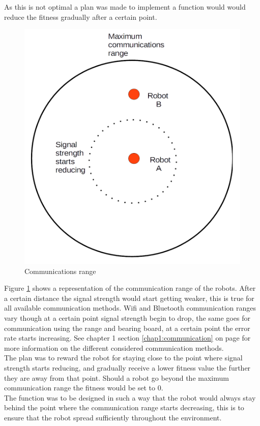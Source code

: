 As this is not optimal a plan was made to implement a function would would reduce the fitness gradually after a certain point. 

\begin{figure}[h]
\centering
\includegraphics[scale=0.5]{Chapter4/images/comms.png}
\caption{Communications range}
\label{fig:coms}
\end{figure}

Figure \ref{fig:coms} shows a representation of the communication range of the robots. After a certain distance the signal strength would start getting weaker, this is true for all available communication methods. Wifi and Bluetooth communication ranges vary though at a certain point signal strength begin to drop, the same goes for communication using the range and bearing board, at a certain point the error rate starts increasing. See chapter 1 section \ref{chap1:communication} on page \pageref{chap1:communication} for more information on the different considered communication methods. \\

The plan was to reward the robot for staying close to the point where signal strength starts reducing, and gradually receive a lower fitness value the further they are away from that point. Should a robot go beyond the maximum communication range the fitness would be set to 0. \\
The function was to be designed in such a way that the robot would always stay behind the point where the communication range starts decreasing, this is to ensure that the robot spread sufficiently throughout the environment. 

